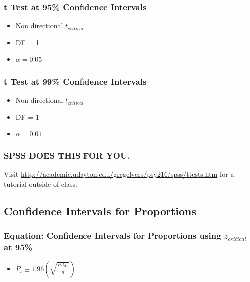 \documentclass[]{article}
\begin{document}
\subsubsection{t Test at 95\% Confidence
Intervals}\label{t-test-at-95-confidence-intervals}

\begin{itemize}
\itemsep1pt\parskip0pt
\item
  Non directional $t_{critical}$
\item
  DF = 1
\item
  $\alpha = 0.05$
\end{itemize}

\subsubsection{t Test at 99\% Confidence
Intervals}\label{t-test-at-99-confidence-intervals}

\begin{itemize}
\itemsep1pt\parskip0pt
\item
  Non directional $t_{critical}$
\item
  DF = 1
\item
  $\alpha = 0.01$
\end{itemize}

\subsubsection{SPSS DOES THIS FOR YOU.}\label{spss-does-this-for-you.}

Visit
\url{http://academic.udayton.edu/gregelvers/psy216/spss/ttests.htm} for
a tutorial outside of class.

\subsection{Confidence Intervals for
Proportions}\label{confidence-intervals-for-proportions}

\subsubsection{Equation: Confidence Intervals for Proportions using
$z_{critical}$ at
95\%}\label{equation-confidence-intervals-for-proportions-using-zux5fcritical-at-95}

\begin{itemize}
\itemsep1pt\parskip0pt
\item
  $P_s \pm 1.96(\sqrt{\frac{P_p Q_p}{n}})$
\end{itemize}
\end{document}
